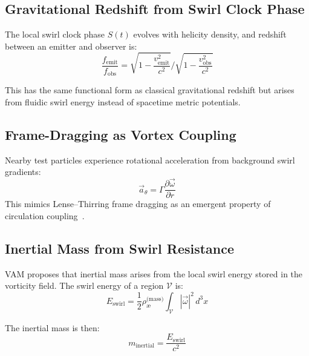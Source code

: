 \documentclass[12pt]{article}
\begin{document}
    \subsection{Gravitational Redshift from Swirl Clock Phase}

    The local swirl clock phase $S(t)$ evolves with helicity density, and redshift between an emitter and observer is:
    \begin{equation}
        \frac{f_{\text{emit}}}{f_{\text{obs}}} = \sqrt{1 - \frac{v_{\text{emit}}^2}{c^2}} \bigg/ \sqrt{1 - \frac{v_{\text{obs}}^2}{c^2}}
        \label{eq:gravitational_redshift}
    \end{equation}

    This has the same functional form as classical gravitational redshift but arises from fluidic swirl energy instead of spacetime metric potentials.

    \subsection{Frame-Dragging as Vortex Coupling}

    Nearby test particles experience rotational acceleration from background swirl gradients:
    \begin{equation}
        \vec{a}_\theta = \Gamma \frac{\partial \vec{\omega}}{\partial r}
        \label{eq:frame_drag_accel}
    \end{equation}
    This mimics Lense–Thirring frame dragging as an emergent property of circulation coupling~\cite{thorne1986blackholes}.

    \subsection{Inertial Mass from Swirl Resistance}

    VAM proposes that inertial mass arises from the local swirl energy stored in the vorticity field. The swirl energy of a region $\mathcal{V}$ is:
    \begin{equation}
        E_{\text{swirl}} = \frac{1}{2} \rho_{\text{\ae}}^{\text{(mass)}} \int_{\mathcal{V}} |\vec{\omega}|^2 \, d^3x
        \label{eq:swirl_energy}
    \end{equation}

    The inertial mass is then:
    \begin{equation}
        m_{\text{inertial}} = \frac{E_{\text{swirl}}}{c^2}
        \label{eq:inertial_mass}
    \end{equation}
\end{document}
